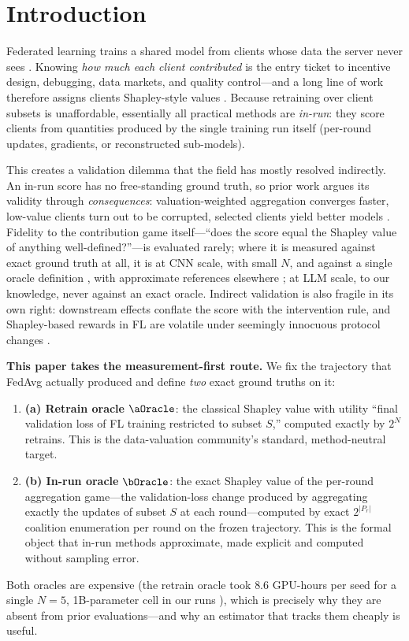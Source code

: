 \section{Introduction}
\label{sec:intro}

Federated learning trains a shared model from clients whose data the server never
sees \citep{mcmahan2017fedavg}. Knowing \emph{how much each client contributed} is
the entry ticket to incentive design, debugging, data markets, and quality
control---and a long line of work therefore assigns clients Shapley-style values
\citep{wang2020fedsv, liu2022gtg, fan2022comfedsv, sun2023shapleyfl}. Because
retraining over client subsets is unaffordable, essentially all practical methods
are \emph{in-run}: they score clients from quantities produced by the single
training run itself (per-round updates, gradients, or reconstructed sub-models).

This creates a validation dilemma that the field has mostly resolved indirectly.
An in-run score has no free-standing ground truth, so prior work argues its
validity through \emph{consequences}: valuation-weighted aggregation converges
faster, low-value clients turn out to be corrupted, selected clients yield better
models \citep{sun2023shapleyfl, fedif2025, shapfed2024}. Fidelity to the
contribution game itself---``does the score equal the Shapley value of anything
well-defined?''---is evaluated rarely; where it is measured against exact
ground truth at all, it is at CNN scale, with small $N$, and against a single
oracle definition \citep{liu2022gtg, space2024}, with approximate references
elsewhere \citep{fan2022comfedsv}; at LLM scale, to our knowledge, never
against an exact oracle. Indirect validation is also fragile in its own right:
downstream effects conflate the score with the intervention rule, and
Shapley-based rewards in FL are volatile under seemingly innocuous protocol
changes \citep{shapleyvolatility}.

\textbf{This paper takes the measurement-first route.} We fix the trajectory
that FedAvg actually produced and define \emph{two} exact ground truths on it:
\begin{enumerate}[leftmargin=2em, itemsep=1pt]
\item \textbf{(a) Retrain oracle} $\aOracle$: the classical Shapley value with
utility ``final validation loss of FL training restricted to subset $S$,''
computed exactly by $2^N$ retrains. This is the data-valuation community's
standard, method-neutral target.
\item \textbf{(b) In-run oracle} $\bOracle$: the exact Shapley value of the
per-round aggregation game---the validation-loss change produced by aggregating
exactly the updates of subset $S$ at each round---computed by exact $2^{|P_r|}$
coalition enumeration per round on the frozen trajectory. This is the formal
object that in-run methods approximate, made explicit and computed without
sampling error.
\end{enumerate}
Both oracles are expensive (the retrain oracle took $8.6$ GPU-hours per seed
for a single $N{=}5$, 1B-parameter cell in our runs ), which is precisely why they are absent from
prior evaluations---and why an estimator that tracks them cheaply is useful.

